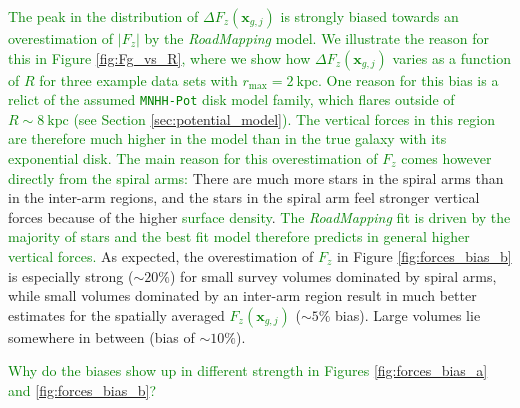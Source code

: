 \documentclass[iop,revtex4,numberedappendix,appendixfloats]{emulateapj}
\newcommand{\vect}[1]{\boldsymbol{#1}}
\newcommand{\RM}{{\sl RoadMapping}}
\newcommand{\NEW}[1]{\textcolor{Green}{#1}}
\newcommand{\OLD}[1]{}
\begin{document}
\NEW{The peak in the distribution of $\Delta F_z(\vect{x}_{g,j})$ is strongly biased towards an overestimation of $|F_{z}|$ by the \RM{} model. We illustrate the reason for this in Figure \ref{fig:Fg_vs_R}, where we show how $\Delta F_z(\vect{x}_{g,j})$ varies as a function of $R$ for three example data sets with $r_\text{max}=2~\text{kpc}$. One reason for this bias is a relict of the assumed \texttt{MNHH-Pot} disk model family, which flares outside of $R\sim8~\text{kpc}$ (see Section \ref{sec:potential_model}). The vertical forces in this region are therefore much higher in the model than in the true galaxy with its exponential disk. The main reason for this overestimation of $F_z$ comes however directly from the spiral arms:} \OLD{The peak of $\Delta F_z(*_i)$ in Figure \ref{fig:forces_bias_a} is approximately at 0, while the peak of $\Delta F_z(g_j)$ is strongly biased towards an overestimation of $|F_{z,M}|$.} There are much more stars in the spiral arms than in the inter-arm regions, and the stars in the spiral arm feel stronger vertical forces because of the higher \OLD{disk mass}\NEW{surface density}. \NEW{The \RM{} fit is driven by the majority of stars and the best fit model therefore predicts in general higher vertical forces.} \OLD{\RM{} finds a model that in general has much stronger vertical forces than expected for a smooth potential. While the actual vertical forces that the many stars in the spiral arms feel are very well recovered, it becomes obvious when looking at the grid points regularly distributed in space that the \RM{} vertical forces are too strong on a spatial average. We illustrate this also in Figure \ref{fig:Fg_vs_z_and_R}: Regions far away from the strongest spiral arms (at large $R$ and large $|z|$, see Figure \ref{fig:simulation}) are not well described by a potential derived mostly from stars in spiral arms.} As expected, the overestimation of \OLD{$|F_{z,T}(g_j)|$}\NEW{$F_{z}$} in Figure \ref{fig:forces_bias_b} is especially strong ($\sim 20 \%$) for small survey volumes dominated by spiral arms, while small volumes dominated by an inter-arm region result in much better estimates for the spatially averaged \OLD{$F_z(g_j)$}\NEW{$F_z(\vect{x}_{g,j})$} ($\sim5\%$ bias). Large volumes lie somewhere in between (bias of $\sim10\%$).

\NEW{Why do the biases show up in different strength in Figures \ref{fig:forces_bias_a} and \ref{fig:forces_bias_b}?}
\end{document}
